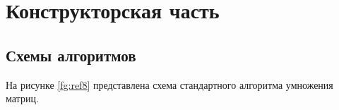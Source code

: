 \documentclass[12pt]{report}
\begin{document}
\chapter{Конструкторская часть}

\section{Схемы алгоритмов}

На рисунке \ref{fg:ref8} представлена схема стандартного алгоритма умножения матриц.

\begin{figure}[ht!]
\end{figure}
\end{document}
